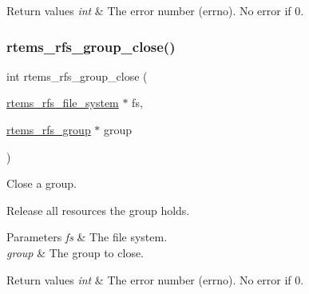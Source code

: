 \begin{DoxyRetVals}{Return values}
{\em int} & The error number (errno). No error if 0. \\
\hline
\end{DoxyRetVals}
\mbox{\label{rtems-rfs-group_8c_a5f2a47d06d6a8209b182348b7b38f91d}} 
\subsubsection{\texorpdfstring{rtems\_rfs\_group\_close()}{rtems\_rfs\_group\_close()}}
{\footnotesize\ttfamily int rtems\+\_\+rfs\+\_\+group\+\_\+close (\begin{DoxyParamCaption}\item[{\mbox{\hyperlink{struct__rtems__rfs__file__system}{rtems\+\_\+rfs\+\_\+file\+\_\+system}} $\ast$}]{fs,  }\item[{\mbox{\hyperlink{group__rtems__rfs_ga0e7b27c60e21039ef07a8c843fa8a3e5}{rtems\+\_\+rfs\+\_\+group}} $\ast$}]{group }\end{DoxyParamCaption})}



Close a group. 

Release all resources the group holds.


\begin{DoxyParams}{Parameters}
{\em fs} & The file system. \\
\hline
{\em group} & The group to close. \\
\hline
\end{DoxyParams}

\begin{DoxyRetVals}{Return values}
{\em int} & The error number (errno). No error if 0. \\
\hline
\end{DoxyRetVals}
\mbox{\label{rtems-rfs-group_8c_ac8ab81ba00e5100d7f755ff951b28a83}} 
